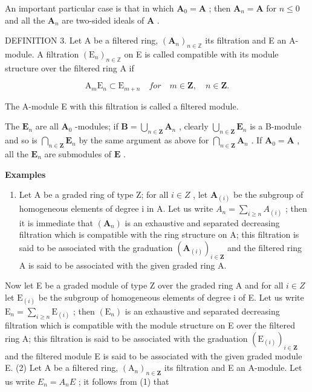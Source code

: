 An important particular case is that in which \(\mathbf{A}_0 = \mathbf{A}\) ; then \(\mathbf{A}_n = \mathbf{A}\) for \(n \leqslant 0\) and all the \(\mathbf{A}_n\) are two-sided ideals of \(\mathbf{A}\) .

DEFINITION 3. Let A be a filtered ring, \((\mathbf{A}_n)_{n\in \mathbb{Z}}\) its filtration and E an A-module. A filtration \((\mathrm{E}_n)_{n\in \mathbb{Z}}\) on E is called compatible with its module structure over the filtered ring A if

\[
\mathrm{A} _ {m} \mathrm{E} _ {n} \subset \mathrm{E} _ {m + n} \quad for \quad m \in \mathbf {Z}, \quad n \in \mathbf {Z}.\tag{3}
\]

The A-module E with this filtration is called a filtered module.

The \(\mathbf{E}_n\) are all \(\mathbf{A}_0\) -modules; if \(\mathbf{B} = \bigcup_{n \in \mathbf{Z}} \mathbf{A}_n\) , clearly \(\bigcup_{n \in \mathbf{Z}} \mathbf{E}_n\) is a B-module and so is \(\bigcap_{n \in \mathbf{Z}} \mathbf{E}_n\) by the same argument as above for \(\bigcap_{n \in \mathbf{Z}} \mathbf{A}_n\) . If \(\mathbf{A}_0 = \mathbf{A}\) , all the \(\mathbf{E}_n\) are submodules of \(\mathbf{E}\) .

\textbf{Examples}\par

\begin{enumerate}
\def\labelenumi{(\arabic{enumi})}
\tightlist
\item
  Let A be a graded ring of type Z; for all \(i \in Z\) , let \(\mathbf{A}_{(i)}\) be the subgroup of homogeneous elements of degree i in A. Let us write \(A_{n} = \sum_{i \geq n} A_{(i)}\) ; then it is immediate that \((\mathbf{A}_{n})\) is an exhaustive and separated decreasing filtration which is compatible with the ring structure on A; this filtration is said to be associated with the graduation \((\mathbf{A}_{(i)})_{i \in \mathbf{Z}}\) and the filtered ring A is said to be associated with the given graded ring A.
\end{enumerate}

Now let E be a graded module of type Z over the graded ring A and for all \(i \in Z\) let \(\mathrm{E}_{(i)}\) be the subgroup of homogeneous elements of degree i of E. Let us write \(\mathrm{E}_{n} = \sum_{i \geqslant n} \mathrm{E}_{(i)}\) ; then \((\mathrm{E}_{n})\) is an exhaustive and separated decreasing filtration which is compatible with the module structure on E over the filtered ring A; this filtration is said to be associated with the graduation \((\mathrm{E}_{(i)})_{i \in \mathbf{Z}}\) and the filtered module E is said to be associated with the given graded module E. (2) Let A be a filtered ring, \((\mathrm{A}_{n})_{n \in \mathbf{Z}}\) its filtration and E an A-module. Let us write \(E_{n} = A_{n}E\) ; it follows from (1) that

